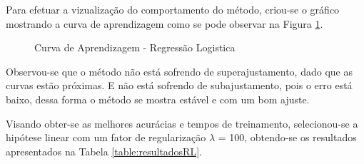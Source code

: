 Para efetuar a vizualização do comportamento do método, criou-se o gráfico mostrando a curva de aprendizagem como se pode observar na Figura \ref{fig:RL}.

\begin{figure}[h]
\centering
{}
\caption{Curva de Aprendizagem - Regressão Logistica}
\label{fig:RL}
\end{figure}

Observou-se que o método não está sofrendo de superajustamento, dado que as curvas estão próximas. E não está sofrendo de subajustamento, pois o erro está baixo, dessa forma o método se mostra estável e com um bom ajuste.

Visando obter-se as melhores acurácias e tempos de treinamento, selecionou-se a hipótese linear com um fator de regularização \(\lambda\) = 100, obtendo-se os resultados apresentados na Tabela \ref{table:resultadosRL}.

